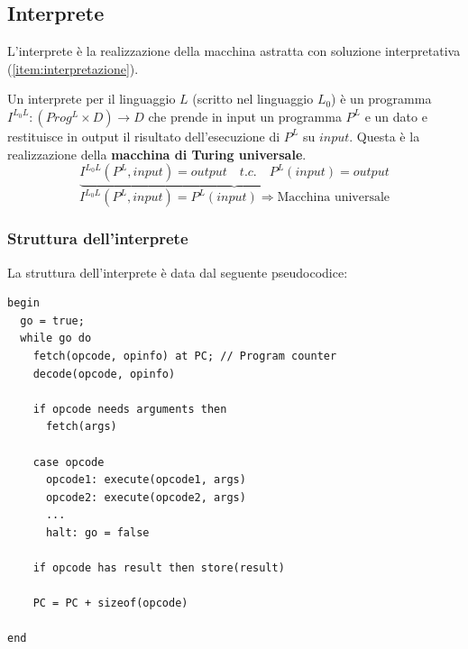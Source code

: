 \documentclass[a4paper]{article}
\begin{document}
\subsection{Interprete}
L'interprete è la realizzazione della macchina astratta con soluzione interpretativa
(\ref{item:interpretazione}).
\begin{definition}[Interprete]
  Un interprete per il linguaggio \( L \) (scritto nel linguaggio \( L_0 \)) è un programma
  \( I^{L_0L}: (Prog^L \times D) \to D \) che prende in input un programma \( P^L \) e un dato
  e restituisce in output il risultato dell'esecuzione di \( P^L \) su \( input \).
  Questa è la realizzazione della \textbf{macchina di Turing universale}.
  \[
    \underbrace{I^{L_0L}(P^L, input) = output \quad t.c. \quad P^L(input) = output}
  \] 
  \[
    I^{L_0L}(P^L, input) = P^L(input) \Rightarrow \text{Macchina universale}
  \] 
\end{definition}

\subsubsection{Struttura dell'interprete}
La struttura dell'interprete è data dal seguente pseudocodice:
\begin{lstlisting}
begin
  go = true;
  while go do
    fetch(opcode, opinfo) at PC; // Program counter
    decode(opcode, opinfo)

    if opcode needs arguments then
      fetch(args)

    case opcode
      opcode1: execute(opcode1, args)
      opcode2: execute(opcode2, args)
      ...
      halt: go = false

    if opcode has result then store(result)

    PC = PC + sizeof(opcode)

end
\end{lstlisting}
\end{document}
